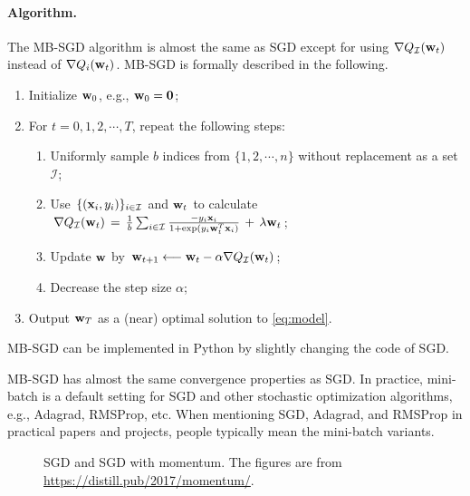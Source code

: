 \documentclass[11pt]{article}
\numberwithin{equation}{section}
\def\w{{\bf w}}
\def\x{{\bf x}}
\def\0{{\bf 0}}
\def\IM{{\mathcal I}}
\begin{document}
\paragraph{Algorithm.}
The MB-SGD algorithm is almost the same as SGD except for using $\nabla Q_{\IM} (\w_t)$ instead of $\nabla Q_i (\w_t)$.
MB-SGD is formally described in the following.
\begin{enumerate}
	\item 
	Initialize $\w_0$, e.g., $\w_0 = \0$;
	\item
	For $t = 0, 1, 2, \cdots , T$, repeat the following steps:
	\begin{enumerate}
		\item
		Uniformly sample $b$ indices from $\{ 1 , 2, \cdots , n \}$ without replacement as a set $\IM$;
		\item 
		Use $\{ (\x_i, y_i) \}_{i \in \IM}$ and $\w_t$ to calculate
		$\nabla Q_{\IM} (\w_t) \, = \, \frac{1}{b} \sum_{i \in \IM} \frac{-  y_i \x_i }{1+\exp({y_i \w_t^T \x_i})} \, + \, \lambda \w_t $;
		\item
		Update $\w$ by
		$\w_{t+1} \longleftarrow \w_t - \alpha \nabla Q_{\IM} (\w_t)$;
		\item
		Decrease the step size $\alpha$;
	\end{enumerate}
	\item
	Output $\w_{T}$ as a (near) optimal solution to \eqref{eq:model}.
\end{enumerate}
MB-SGD can be implemented in Python by slightly changing the code of SGD.




MB-SGD has almost the same convergence properties as SGD.
In practice, mini-batch is a default setting for SGD and other stochastic optimization algorithms, e.g., Adagrad, RMSProp, etc.
When mentioning SGD, Adagrad, and RMSProp in practical papers and projects, people typically mean the mini-batch variants.



\begin{figure}[!h]
	\centering
	\vspace{3mm}
	\caption{SGD and SGD with momentum. 
		The figures are from \url{https://distill.pub/2017/momentum/}.}
	\label{fig:sgd}
\end{figure}
\end{document}
